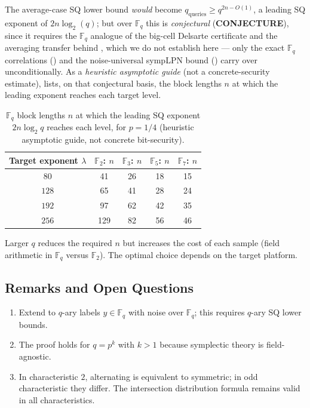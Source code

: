 \documentclass[11pt,a4paper]{article}
\theoremstyle{plain}
\theoremstyle{definition}
\newcommand{\F}{\mathbb{F}}
\begin{document}
The average-case SQ lower bound \emph{would} become $q_{\mathrm{queries}} \geq q^{2n-O(1)}$, a leading SQ exponent of $2n \log_2(q)$; but over $\F_q$ this is \emph{conjectural} (\textbf{CONJECTURE}), since it requires the $\F_q$ analogue of the big-cell Delsarte certificate and the averaging transfer behind , which we do not establish here --- only the exact $\F_q$ correlations () and the noise-universal sympLPN bound () carry over unconditionally. As a \emph{heuristic asymptotic guide} (not a concrete-security estimate),  lists, on that conjectural basis, the block lengths $n$ at which the leading exponent reaches each target level.

\begin{table}[ht]
\centering
\caption{$\F_q$ block lengths $n$ at which the leading SQ exponent $2n\log_2 q$ reaches each level, for $p=1/4$ (heuristic asymptotic guide, not concrete bit-security).}
\label{tab:fq-params}
\begin{tabular}{@{}ccccc@{}}
\hline
Target exponent $\lambda$ & $\F_2$: $n$ & $\F_3$: $n$ & $\F_5$: $n$ & $\F_7$: $n$ \\
\hline
$80$  & 41  & 26 & 18 & 15 \\
$128$ & 65  & 41 & 28 & 24 \\
$192$ & 97  & 62 & 42 & 35 \\
$256$ & 129 & 82 & 56 & 46 \\
\hline
\end{tabular}
\end{table}

Larger $q$ reduces the required $n$ but increases the cost of each sample (field arithmetic in $\F_q$ versus $\F_2$). The optimal choice depends on the target platform.

\subsection{Remarks and Open Questions}
\label{subsec:fq-open}

\begin{enumerate}
\item Extend to $q$-ary labels $y \in \F_q$ with noise over $\F_q$; this requires $q$-ary SQ lower bounds.
\item The proof holds for $q = p^k$ with $k > 1$ because symplectic theory is field-agnostic.
\item In characteristic $2$, alternating is equivalent to symmetric; in odd characteristic they differ. The intersection distribution formula remains valid in all characteristics.
\end{enumerate}
\end{document}
